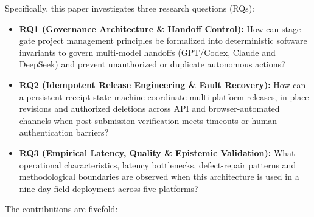 \documentclass[11pt,a4paper]{article}
\theoremstyle{definition}
\begin{document}
Specifically, this paper investigates three research questions (RQs):

\begin{itemize}[leftmargin=1.8em]
    \item \textbf{RQ1 (Governance Architecture \& Handoff Control):} How can stage-gate project management principles be formalized into deterministic software invariants to govern multi-model handoffs (GPT/Codex, Claude and DeepSeek) and prevent unauthorized or duplicate autonomous actions?
    \item \textbf{RQ2 (Idempotent Release Engineering \& Fault Recovery):} How can a persistent receipt state machine coordinate multi-platform releases, in-place revisions and authorized deletions across API and browser-automated channels when post-submission verification meets timeouts or human authentication barriers?
    \item \textbf{RQ3 (Empirical Latency, Quality \& Epistemic Validation):} What operational characteristics, latency bottlenecks, defect-repair patterns and methodological boundaries are observed when this architecture is used in a nine-day field deployment across five platforms?
\end{itemize}

The contributions are fivefold:
\end{document}
